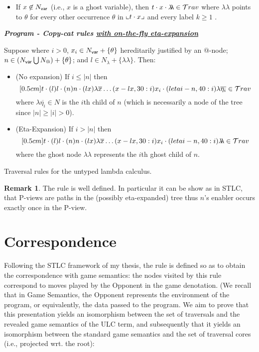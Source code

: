 \documentclass{article}
\theoremstyle{definition}
\newtheorem{remark}{Remark}[section]
\newcommand\Nodes{N}%
\newcommand{\ghostlmd}{{\lambda\!\!\lambda}}
\newcommand{\ghostvar}{\theta}
\begin{document}
\begin{FramedTable}
\begin{itemize}[]
\item {} If $x\not \in \Nodes_{\sf var}$ (i.e., $x$ is a ghost variable), then $t \cdot x \cdot \ghostlmd \in\travset$ where $\ghostlmd$ points to $\ghostvar$ for every other occurrence $\ghostvar$ in $\llcorner t\cdot x \lrcorner$ and every label $k\geq 1$
    .
\end{itemize}

\emph{\bf Program - Copy-cat rules \underline{with on-the-fly eta-expansion}}

Suppose  where $i>0$, $x_i \in \Nodes_{\sf var} + \{ \ghostvar\}$ hereditarily justified by an $@$-node; $n \in (\Nodes_{\sf var} \Union \Nodes_{@}) + \{ \ghostvar \}$; and $l \in \Nodes_\lambda + \{\ghostlmd\}$. Then:

\begin{itemize}
  \item {} (No expansion) If $i \leq |n|$ then
  $$\Pstr[0.5cm]{ t \cdot(l){l} \cdot
(n){n} \cdot (lx){\lambda \overline{x}}  \ldots (x-lx,30:i){x_i}
    \cdot (letai-n,40:i){\lambda \overline{\eta_i}}
     \in\travset}$$
where $\lambda \overline{\eta_i} \in N$ is the $i$th child of $n$ (which is necessarily a node of the tree since $|n|\geq|i|>0$).

\item {} (Eta-Expansion) If $i > |n|$ then
  $$\Pstr[0.5cm]{ t \cdot(l){l} \cdot
(n){n} \cdot (lx){\lambda \overline{x}}  \ldots (x-lx,30:i){x_i}
    \cdot (letai-n,40:i){\ghostlmd}
     \in\travset}$$
     where the ghost node $\ghostlmd$ represents the $i$th ghost child of $n$.
\end{itemize}

\caption{Traversal rules for the untyped lambda calculus.}
 \label{tab:trav_rules}
\end{FramedTable}

\begin{remark}
The rule  is well defined. In particular it can be show as in STLC, that P-views are paths in the (possibly eta-expanded) tree thus $n$'s enabler occurs exactly once in the P-view.
\end{remark}

\section{Correspondence}
Following the STLC framework of my thesis, the rule  is defined so as to obtain the correspondence with game semantics: the nodes visited by this rule correspond to moves played by the Opponent in the game denotation. (We recall that in Game Semantics, the Opponent represents the environment of the program, or equivalently, the data passed to the program.
We aim to prove that this presentation yields an isomorphism between the set of traversals and the revealed game semantics of the ULC term, and subsequently that it yields an isomorphism between the standard game semantics and the set of traversal cores (i.e., projected wrt. the root):
\end{document}
